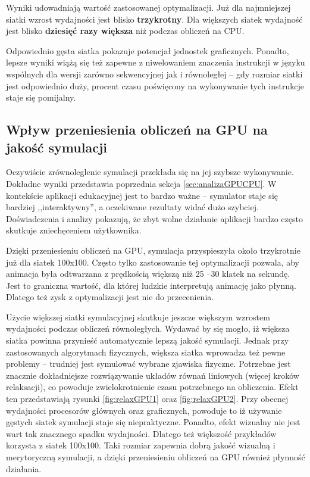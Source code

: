 Wyniki udowadniają wartość zastosowanej optymalizacji. Już dla najmniejszej
siatki wzrost wydajności jest blisko \textbf{trzykrotny}. Dla większych siatek
wydajność jest blisko \textbf{dziesięć razy większa} niż podczas obliczeń na
CPU.

Odpowiednio gęsta siatka pokazuje potencjał jednostek graficznych. Ponadto,
lepsze wyniki wiążą się też zapewne z niwelowaniem znaczenia instrukcji w języku
 wspólnych dla wersji zarówno sekwencyjnej jak i równoległej --
gdy rozmiar siatki jest odpowiednio duży, procent czasu poświęcony na
wykonywanie tych instrukcje staje się pomijalny.

\subsection{Wpływ przeniesienia obliczeń na GPU na jakość symulacji}

Oczywiście zrównoleglenie symulacji przekłada się na jej szybsze wykonywanie.
Dokładne wyniki przedstawia poprzednia sekcja \ref{sec:analizaGPUCPU}. W
kontekście aplikacji edukacyjnej jest to bardzo ważne -- symulator staje się
bardziej ,,interaktywny'', a oczekiwane rezultaty widać dużo szybciej.
Doświadczenia i analizy pokazują, że zbyt wolne działanie aplikacji bardzo
często skutkuje zniechęceniem użytkownika.

Dzięki przeniesieniu obliczeń na GPU, symulacja przyspieszyła około trzykrotnie
już dla siatek 100x100. Często tylko zastosowanie tej optymalizacji pozwala, aby
animacja była odtwarzana z prędkością większą niż 25 --30 klatek na sekundę.
Jest to graniczna wartość, dla której ludzkie interpretują animację jako płynną.
Dlatego też zysk z optymalizacji jest nie do przecenienia.

Użycie większej siatki symulacyjnej skutkuje jeszcze większym wzrostem
wydajności podczas obliczeń równoległych. Wydawać by się mogło, iż większa
siatka powinna przynieść automatycznie lepszą jakość symulacji. Jednak przy
zastosowanych algorytmach fizycznych, większa siatka wprowadza też pewne
problemy -- trudniej jest symulować wybrane zjawiska fizyczne. Potrzebne jest
znacznie dokładniejsze rozwiązywanie układów równań liniowych (więcej kroków
relaksacji), co powoduje zwielokrotnienie czasu potrzebnego na obliczenia. Efekt
ten przedstawiają rysunki \ref{fig:relaxGPU1} oraz \ref{fig:relaxGPU2}. Przy
obecnej wydajności procesorów głównych oraz graficznych, powoduje to iż używanie
gęstych siatek symulacji staje się niepraktyczne. Ponadto, efekt wizualny nie
jest wart tak znacznego spadku wydajności. Dlatego też większość przykładów
korzysta z siatek 100x100. Taki rozmiar zapewnia dobrą jakość wizualną  i
merytoryczną symulacji, a dzięki przeniesieniu obliczeń na GPU również płynność
działania.

